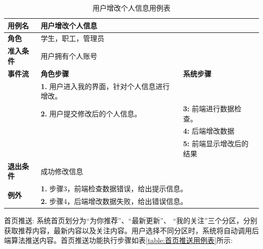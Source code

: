 \begin{table}[H]
  \centering
  \renewcommand\arraystretch{1.1}
  \small
  \caption{用户增改个人信息用例表}
  \label{table:用户增改个人信息用例表}
  \setlength{\tabcolsep}{4mm}
  \begin{tabular}{|p{2cm}|p{5.75cm}|p{5.75cm}|}
    \hline \textbf{用例名} & \multicolumn{2}{l|}{用户增改个人信息} \\
    \hline \textbf{角色} & \multicolumn{2}{l|}{学生，职工，管理员} \\
    \hline \textbf{准入条件} & \multicolumn{2}{l|}{用户拥有个人账号} \\
    \hline \textbf{事件流} & \textbf{角色步骤} & \textbf{系统步骤} \\
    \hline \multirow{3}{*}{~} & \textbf{1.} 用户进入我的界面，针对个人信息进行增改。  &    \\
    \cline{2-3} & \textbf{2.} 用户提交修改后的个人信息。 & \textbf{3:} 前端进行数据检查。 \\
    \cline{2-3} &  & \textbf{4:} 后端增改数据 \\
    \cline{2-3} &  & \textbf{5:} 前端显示增改后的结果 \\
    \hline \textbf{退出条件}  & \multicolumn{2}{l|}{成功修改信息} \\
    \hline \multirow{2}{*}{\textbf{例外}} & \multicolumn{2}{l|}{\textbf{1.} 步骤3，前端检查数据错误，给出提示信息。} \\
     & \multicolumn{2}{l|}{\textbf{2.} 步骤4，后端增改数据失败，给出错误信息。} \\
    \hline
  \end{tabular}
\end{table}

首页推送: 系统首页划分为``为你推荐''、``最新更新''、 ``我的关注''三个分区，分别获取推荐内容，最新内容以及关注内容。用户选择不同分区时，系统将自动调用后端算法推送内容。首页推送功能执行步骤如表\ref{table:首页推送用例表}所示:

